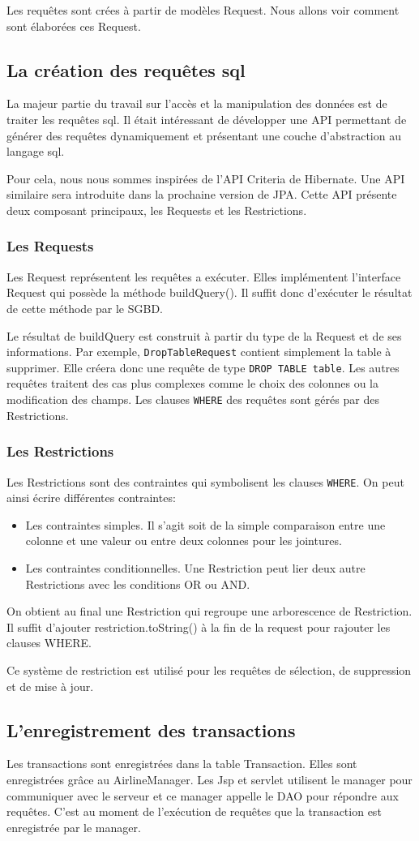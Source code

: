 Les requêtes sont crées à partir de modèles Request. Nous allons voir comment sont élaborées ces Request.
\subsection{La création des requêtes sql}
La majeur partie du travail sur l'accès et la manipulation des données est de traiter les requêtes sql. Il était intéressant de développer une API permettant de générer des requêtes dynamiquement et présentant une couche d'abstraction au langage sql.

Pour cela, nous nous sommes inspirées de l'API Criteria de Hibernate. Une API similaire sera introduite dans la prochaine version de JPA. Cette API présente deux composant principaux, les Requests et les Restrictions.
\subsubsection{Les Requests}
Les Request représentent les requêtes a exécuter. Elles implémentent l'interface Request qui possède la méthode buildQuery(). Il suffit donc d'exécuter le résultat de cette méthode par le SGBD.

Le résultat de buildQuery est construit à partir du type de la Request et de ses informations. Par exemple, \texttt{DropTableRequest} contient simplement la table à supprimer. Elle créera donc une requête de type \texttt{DROP TABLE table}. Les autres requêtes traitent des cas plus complexes comme le choix des colonnes ou la modification des champs. 
Les clauses \texttt{WHERE} des requêtes sont gérés par des Restrictions.
\subsubsection{Les Restrictions}
Les Restrictions sont des contraintes qui symbolisent les clauses \texttt{WHERE}. On peut ainsi écrire différentes contraintes:
\begin{itemize}
 \item Les contraintes simples. Il s'agit soit de la simple comparaison entre une colonne et une valeur ou entre deux colonnes pour les jointures.
 \item Les contraintes conditionnelles. Une Restriction peut lier deux autre Restrictions avec les conditions OR ou AND.
\end{itemize}
On obtient au final une Restriction qui regroupe une arborescence de Restriction. Il suffit d'ajouter restriction.toString() à la fin de la request pour rajouter les clauses WHERE. 

Ce système de restriction est utilisé pour les requêtes de sélection, de suppression et de mise à jour.
\subsection{L'enregistrement des transactions}
Les transactions sont enregistrées dans la table Transaction. Elles sont enregistrées grâce au AirlineManager. Les Jsp et servlet utilisent le manager pour communiquer avec le serveur et ce manager appelle le DAO pour répondre aux requêtes. C'est au moment de l'exécution de requêtes que la transaction est enregistrée par le manager.